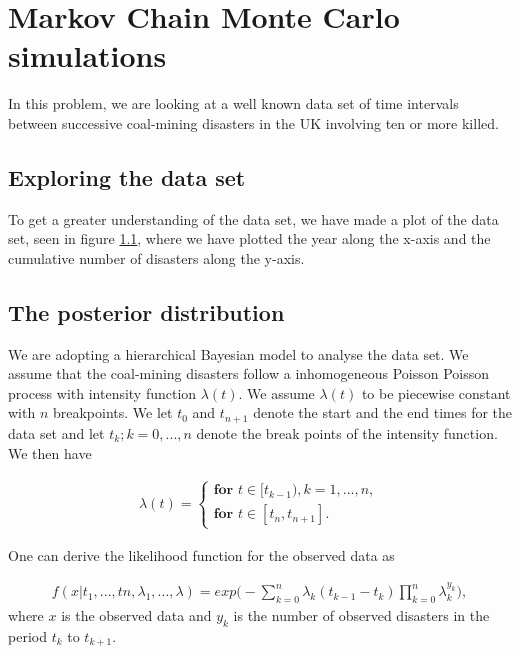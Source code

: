 \section{Markov Chain Monte Carlo simulations}


In this problem, we are looking at a well known data set of time intervals between successive coal-mining disasters in the UK involving ten or more killed. 

\subsection{Exploring the data set}
To get a greater understanding of the data set, we have made a plot of the data set, seen in figure \ref{}, where we have plotted the year along the x-axis and the cumulative number of disasters along the y-axis. 


\subsection{The posterior distribution} \label{posterior}
We are adopting a hierarchical Bayesian model to analyse the data set. We assume that the coal-mining disasters follow a inhomogeneous Poisson Poisson process with intensity function $\lambda(t)$. We assume $\lambda(t)$ to be piecewise constant with $n$ breakpoints. We let $t_0$ and $t_{n+1}$ denote the start and the end times for the data set and let $t_k; k = 0,...,n$ denote the break points of the intensity function. We then have 


\begin{align}
    \lambda(t) = 
    \begin{cases}
        \textbf{for } t \in [t_{k-1}), k = 1,...,n, \\
        \textbf{for } t \in [t_n, t_{n+1}].
    \end{cases}
\end{align}

One can derive the likelihood function for the observed data as

\begin{align}
    f(x|t_1,...,tn,\lambda_1,...,\lambda) 
    = exp \Big( - \sum_{k = 0}^n \lambda_k (t_{k-1} - t_k) \prod_{k = 0}^n \lambda_k^{y_k} \Big), 
\end{align}
where $x$ is the observed data and $y_k$ is the number of observed disasters in the period $t_k$ to $t_{k+1}$. 

